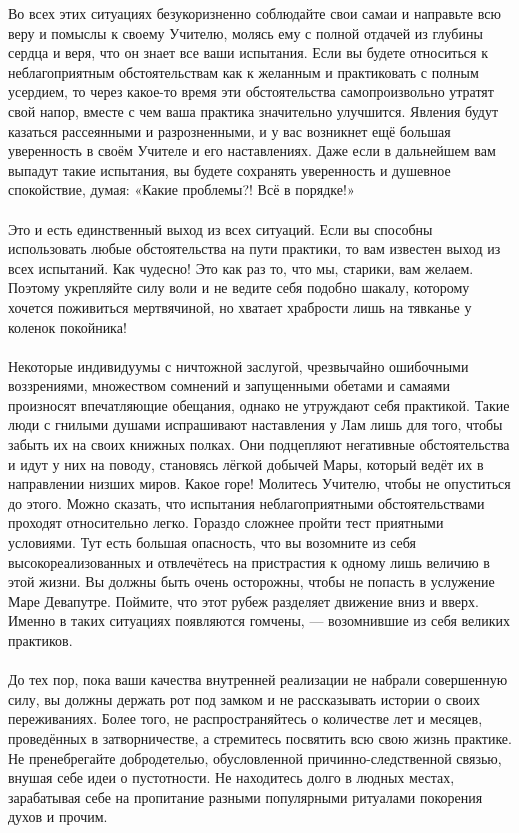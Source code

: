 \newpage
Во всех этих ситуациях безукоризненно соблюдайте свои самаи и направьте всю веру и помыслы к своему Учителю, молясь ему с полной отдачей из глубины сердца и веря, что он знает все ваши испытания. Если вы будете относиться к неблагоприятным обстоятельствам как к желанным и практиковать с полным усердием, то через какое-то время эти обстоятельства самопроизвольно утратят свой напор, вместе с чем ваша практика значительно улучшится. Явления будут казаться рассеянными и разрозненными, и у вас возникнет ещё большая уверенность в своём Учителе и его наставлениях. Даже если в дальнейшем вам выпадут такие испытания, вы будете сохранять уверенность и душевное спокойствие, думая: «Какие проблемы?! Всё в порядке!»
\\ \\ Это и есть единственный выход из всех ситуаций. Если вы способны использовать любые обстоятельства на пути практики, то вам известен выход из всех испытаний. Как чудесно! Это как раз то, что мы, старики, вам желаем. Поэтому укрепляйте силу воли и не ведите себя подобно шакалу, которому хочется поживиться мертвячиной, но хватает храбрости лишь на тявканье у коленок покойника!
\\ \\ Некоторые индивидуумы с ничтожной заслугой, чрезвычайно ошибочными воззрениями, множеством сомнений и запущенными обетами и самаями произносят впечатляющие обещания, однако не утруждают себя практикой. Такие люди с гнилыми душами испрашивают наставления у Лам лишь для того, чтобы забыть их на своих книжных полках. Они подцепляют негативные обстоятельства и идут у них на поводу, становясь лёгкой добычей Мары, который ведёт их в направлении низших миров. Какое горе! Молитесь Учителю, чтобы не опуститься до этого.
\newpage
Можно сказать, что испытания неблагоприятными обстоятельствами проходят относительно легко. Гораздо сложнее пройти тест приятными условиями. Тут есть большая опасность, что вы возомните из себя высокореализованных и отвлечётесь на пристрастия к одному лишь величию в этой жизни. Вы должны быть очень осторожны, чтобы не попасть в услужение Маре Девапутре. Поймите, что этот рубеж разделяет движение вниз и вверх. Именно в таких ситуациях появляются гомчены, — возомнившие из себя великих практиков.
\\ \\ До тех пор, пока ваши качества внутренней реализации не набрали совершенную силу, вы должны держать рот под замком и не рассказывать истории о своих переживаниях. Более того, не распространяйтесь о количестве лет и месяцев, проведённых в затворничестве, а стремитесь посвятить всю свою жизнь практике. Не пренебрегайте добродетелью, обусловленной причинно-следственной связью, внушая себе идеи о пустотности. Не находитесь долго в людных местах, зарабатывая себе на пропитание разными популярными ритуалами покорения духов и прочим.
